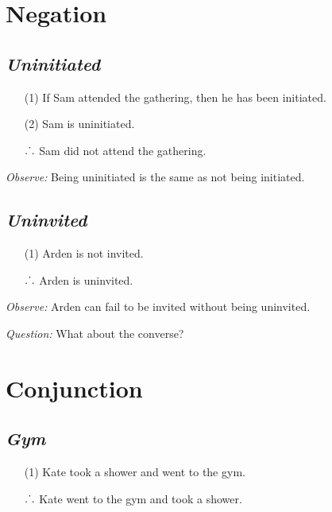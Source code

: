 \documentclass[a4paper, 11pt]{article} %
\def\therefore{\ensuremath{\ldotp\dot{}\,\ldotp}}
\begin{document}
\section*{Negation}

\subsection*{\it \textbf{Uninitiated}}

\begin{enumerate}
  \item[(1)] If Sam attended the gathering, then he has been initiated.
  \item[(2)] Sam is uninitiated.
  \item[\therefore] Sam did not attend the gathering.
\end{enumerate}

\noindent
\textit{Observe:} Being uninitiated is the same as not being initiated.





\subsection*{\it \textbf{Uninvited}}

\begin{enumerate}
  \item[(1)] Arden is not invited.
  \item[\therefore] Arden is uninvited.
\end{enumerate}

\noindent
\textit{Observe:} Arden can fail to be invited without being uninvited.
\vspace{.05in}

\noindent
\textit{Question:} What about the converse?





\section*{Conjunction}

\subsection*{\it \textbf{Gym}}

\begin{enumerate}
  \item[(1)] Kate took a shower and went to the gym.
  \item[\therefore] Kate went to the gym and took a shower.
\end{enumerate}
\end{document}
